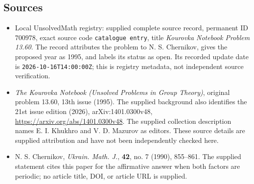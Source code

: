 \documentclass[11pt]{article}
\begin{document}
\subsection{Sources}
\begin{itemize}
\item Local UnsolvedMath registry: supplied complete source record, permanent ID \(700978\), exact source code \texttt{catalogue entry}, title \emph{Kourovka Notebook Problem 13.60}. The record attributes the problem to N. S. Chernikov, gives the proposed year as 1995, and labels its status as open. Its recorded update date is \texttt{2026-10-16T14:00:00Z}; this is registry metadata, not independent source verification.
\item \emph{The Kourovka Notebook (Unsolved Problems in Group Theory)}, original problem 13.60, 13th issue (1995). The supplied background also identifies the 21st issue edition (2026), arXiv:1401.0300v48, \url{https://arxiv.org/abs/1401.0300v48}. The supplied collection description names E. I. Khukhro and V. D. Mazurov as editors. These source details are supplied attribution and have not been independently checked here.
\item N. S. Chernikov, \emph{Ukrain. Math. J.}, \textbf{42}, no. 7 (1990), 855--861. The supplied statement cites this paper for the affirmative answer when both factors are periodic; no article title, DOI, or article URL is supplied.
\end{itemize}
\end{document}
